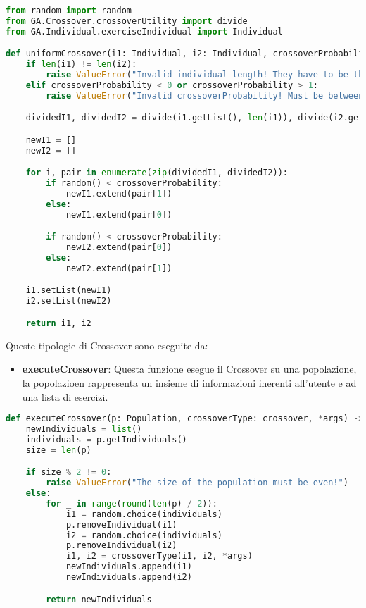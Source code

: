 \documentclass{article}
\begin{document}
\begin{lstlisting}[language=Python, breaklines, no caption]
from random import random
from GA.Crossover.crossoverUtility import divide
from GA.Individual.exerciseIndividual import Individual

def uniformCrossover(i1: Individual, i2: Individual, crossoverProbability: float) -> tuple[Individual, Individual]:
    if len(i1) != len(i2):
        raise ValueError("Invalid individual length! They have to be the same.")
    elif crossoverProbability < 0 or crossoverProbability > 1:
        raise ValueError("Invalid crossoverProbability! Must be between 0 and 1")

    dividedI1, dividedI2 = divide(i1.getList(), len(i1)), divide(i2.getList(), len(i2))

    newI1 = []
    newI2 = []

    for i, pair in enumerate(zip(dividedI1, dividedI2)):
        if random() < crossoverProbability:
            newI1.extend(pair[1])
        else:
            newI1.extend(pair[0])

        if random() < crossoverProbability:
            newI2.extend(pair[0])
        else:
            newI2.extend(pair[1])

    i1.setList(newI1)
    i2.setList(newI2)

    return i1, i2
\end{lstlisting}

\pagebreak

Queste tipologie di Crossover sono eseguite da:

\begin{itemize}
\item\textbf{executeCrossover}: Questa funzione esegue il Crossover su una popolazione, la popolazioen rappresenta un insieme di informazioni inerenti all'utente e ad una lista di esercizi.
\end{itemize}

\begin{lstlisting}[language=Python, breaklines, no caption]
def executeCrossover(p: Population, crossoverType: crossover, *args) -> list[Individual]:
    newIndividuals = list()
    individuals = p.getIndividuals()
    size = len(p)

    if size % 2 != 0:
        raise ValueError("The size of the population must be even!")
    else:
        for _ in range(round(len(p) / 2)):
            i1 = random.choice(individuals)
            p.removeIndividual(i1)
            i2 = random.choice(individuals)
            p.removeIndividual(i2)
            i1, i2 = crossoverType(i1, i2, *args)
            newIndividuals.append(i1)
            newIndividuals.append(i2)

        return newIndividuals
\end{lstlisting}
\end{document}
